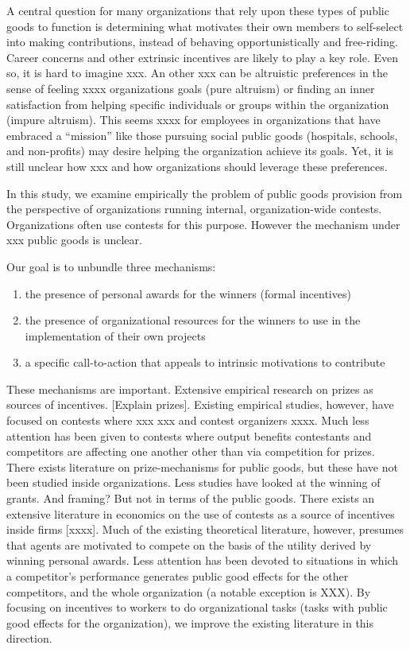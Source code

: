\documentclass[12pt, titlepage]{article}
\providecommand{\tightlist}{%
  \setlength{\itemsep}{0pt}\setlength{\parskip}{0pt}}
\begin{document}
A central question for many organizations that rely upon these types of
public goods to function is determining what motivates their own members
to self-select into making contributions, instead of behaving
opportunistically and free-riding. Career concerns and other extrinsic
incentives are likely to play a key role. Even so, it is hard to imagine
xxx. An other xxx can be altruistic preferences in the sense of feeling
xxxx organizations goals (pure altruism) or finding an inner
satisfaction from helping specific individuals or groups within the
organization (impure altruism). This seems xxxx for employees in
organizations that have embraced a ``mission'' like those pursuing
social public goods (hospitals, schools, and non-profits) may desire
helping the organization achieve its goals. Yet, it is still unclear how
xxx and how organizations should leverage these preferences.

In this study, we examine empirically the problem of public goods
provision from the perspective of organizations running internal,
organization-wide contests. Organizations often use contests for this
purpose. However the mechanism under xxx public goods is unclear.

Our goal is to unbundle three mechanisms:

\begin{enumerate}
\def\labelenumi{(\arabic{enumi})}
\tightlist
\item
  the presence of personal awards for the winners (formal incentives)
\item
  the presence of organizational resources for the winners to use in the
  implementation of their own projects
\item
  a specific call-to-action that appeals to intrinsic motivations to
  contribute
\end{enumerate}

These mechanisms are important. Extensive empirical research on prizes
as sources of incentives. {[}Explain prizes{]}. Existing empirical
studies, however, have focused on contests where xxx xxx and contest
organizers xxxx. Much less attention has been given to contests where
output benefits contestants and competitors are affecting one another
other than via competition for prizes. There exists literature on
prize-mechanisms for public goods, but these have not been studied
inside organizations. Less studies have looked at the winning of grants.
And framing? But not in terms of the public goods. There exists an
extensive literature in economics on the use of contests as a source of
incentives inside firms {[}xxxx{]}. Much of the existing theoretical
literature, however, presumes that agents are motivated to compete on
the basis of the utility derived by winning personal awards. Less
attention has been devoted to situations in which a competitor's
performance generates public good effects for the other competitors, and
the whole organization (a notable exception is XXX). By focusing on
incentives to workers to do organizational tasks (tasks with public good
effects for the organization), we improve the existing literature in
this direction.
\end{document}
